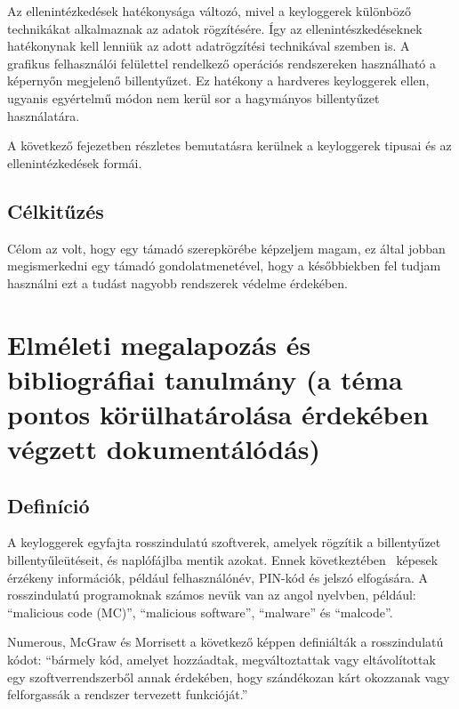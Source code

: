 \documentclass[a4paper, 11pt]{article}
\begin{document}
Az ellenintézkedések hatékonysága változó, mivel a keyloggerek különböző technikákat alkalmaznak az adatok rögzítésére. Így az ellenintészkedéseknek hatékonynak kell lenniük az adott adatrögzítési technikával szemben is. A grafikus felhasználói felülettel rendelkező operációs rendszereken használható a képernyőn megjelenő billentyűzet. Ez hatékony a hardveres keyloggerek ellen, ugyanis egyértelmű módon nem kerül sor a hagymányos billentyűzet használatára.

A következő fejezetben részletes bemutatásra kerülnek a keyloggerek tipusai és az ellenintézkedések formái.

\subsection{Célkitűzés}
Célom az volt, hogy egy támadó szerepkörébe képzeljem magam, ez által jobban megismerkedni egy támadó gondolatmenetével, hogy a későbbiekben fel tudjam használni ezt a tudást nagyobb rendszerek védelme érdekében.

\section{Elméleti megalapozás és bibliográfiai tanulmány (a téma pontos körülhatárolása érdekében végzett dokumentálódás)}\label{sec:bibl}

\subsection{Definíció}
\parencite{ahmed2014survey} A keyloggerek egyfajta rosszindulatú szoftverek, amelyek rögzítik a billentyűzet billentyűleütéseit, és naplófájlba mentik azokat. Ennek következtében \ képesek érzékeny információk, például felhasználónév, PIN-kód és jelszó elfogására. A rosszindulatú programoknak számos nevük van az angol nyelvben, például: ``malicious code (MC)'', ``malicious software'', ``malware'' és ``malcode''.

Numerous, McGraw és Morrisett a következő képpen definiálták a rosszindulatú kódot: \cite{ahmed2014survey} ``bármely kód, amelyet hozzáadtak, megváltoztattak vagy eltávolítottak egy szoftverrendszerből annak érdekében, hogy szándékozan kárt okozzanak vagy felforgassák a rendszer tervezett funkcióját.''
\end{document}
